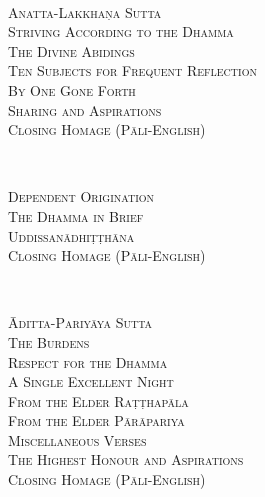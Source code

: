 {  %
  \vspace{1.5cm}

  {\libertinusFont\selectfont\textbf{\textsc{\fontsize{18}{12}\selectfont{}}}}\\

  \textsc{\fontsize{16}{28}\selectfont
    Anatta-Lakkhaṇa Sutta \pageref{anatta-lakkhana}\\
    Striving According to the Dhamma \pageref{striving-according-to-dhamma}\\
    The Divine Abidings \pageref{divine-abidings}\\
    Ten Subjects for Frequent Reflection\\ By One Gone Forth \pageref{ten-recollections}\\
    Sharing and Aspirations \pageref{sharing-aspirations}\\
    Closing Homage (Pāli-English) \pageref{closing-homage}\\
  }

  \clearpage
  \vspace{1.5cm}

  {\libertinusFont\selectfont\textbf{\textsc{\fontsize{18}{12}\selectfont{}}}}\\

  \textsc{\fontsize{16}{28}\selectfont
    Dependent Origination \pageref{dependent-origination}\\
    The Dhamma in Brief \pageref{dhamma-in-brief}\\
    Uddissanādhiṭṭhāna \pageref{uddissanadhitthana}\\
    Closing Homage (Pāli-English) \pageref{closing-homage}\\
  }

  \vspace{1.5cm}

  {\libertinusFont\selectfont\textbf{\textsc{\fontsize{18}{12}\selectfont{}}}}\\

  \textsc{\fontsize{16}{28}\selectfont
    Āditta-Pariyāya Sutta \pageref{aditta-pariyaya}\\
    The Burdens \pageref{burdens}\\
    Respect for the Dhamma \pageref{respect-for-the-dhamma}\\
    A Single Excellent Night \pageref{single-excellent-night}\\
    From the Elder Raṭṭhapāla \pageref{ratthapala}\\
    From the Elder Pārāpariya \pageref{parapariya}\\
    Miscellaneous Verses \pageref{misc-verses}\\
    The Highest Honour and Aspirations \pageref{highest-honour-aspirations}\\
    Closing Homage (Pāli-English) \pageref{closing-homage}\\
  }

}
